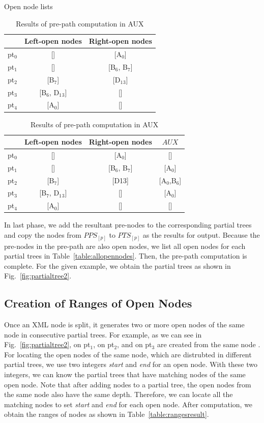 {
\begin{table}[t]
	\caption{Open node lists}
	\label{table:opennodes}
	\centering
	\begin{tabular}{c|cc}
		\hline
		& Left-open nodes	& Right-open nodes \\
		\hline
		pt$_0$	& []			& [A$_0$] \\
		pt$_1$	& []			& [B$_6$, B$_7$] \\
		pt$_2$	& [B$_7$]			& [D$_1$$_3$] \\
		pt$_3$	& [B$_6$, D$_1$$_3$]		& [] \\
		pt$_4$	& [A$_0$]			& [] \\
		\hline
	\end{tabular}

	\caption{Results of pre-path computation in AUX}
	\label{table:tempresult}
	\centering
	\begin{tabular}{c|ccc}
		\hline
		& Left-open nodes	& Right-open nodes & $AUX$\\
		\hline
		pt$_0$	& []			& [A$_0$]  & []\\
		pt$_1$	& []			& [B$_6$, B$_7$] & [A$_0$] \\
		pt$_2$	& [B$_7$]			& [D13] &[A$_0$,B$_6$]\\
		pt$_3$	& [B$_7$, D$_1$$_3$]		& []  & [A$_0$]\\
		pt$_4$	& [A$_0$]			& [] &[]\\
		\hline
	\end{tabular}
\end{table}
}

In last phase, we add the resultant pre-nodes to the corresponding partial trees
and copy the nodes from $PPS_{[p]}$ to $PTS_{[p]}$ as the results for output.
Because the pre-nodes in the pre-path are also open nodes, we list all open
nodes for each partial trees in Table~\ref{table:allopennodes}. Then, the
pre-path computation is complete. For the given example, we obtain the partial
trees as shown in Fig.~\ref{fig:partialtree2}.


\subsection{Creation of Ranges of Open Nodes}
\label{sec:ranges}

Once an XML node is split, it generates two or more open nodes of the same node
in consecutive partial trees. For example, as we can see in
Fig.~\ref{fig:partialtree2},  on pt$_1$,  on pt$_2$, and
  on pt$_3$ are created from the same node . For locating the
open nodes of the same node,  which are distrubted in different partial trees,
we use two integers \textit{start} and \textit{end} for an open node. With these
two integers, we can know the partial trees that have matching nodes of the same
open node. Note that after adding nodes to a partial tree, the open nodes from
the same node also have the same depth. Therefore, we can locate all the
matching nodes to set \textit{start} and \textit{end} for each open node. After
computation, we obtain the ranges of nodes as shown in
Table~\ref{table:rangesresult}.

